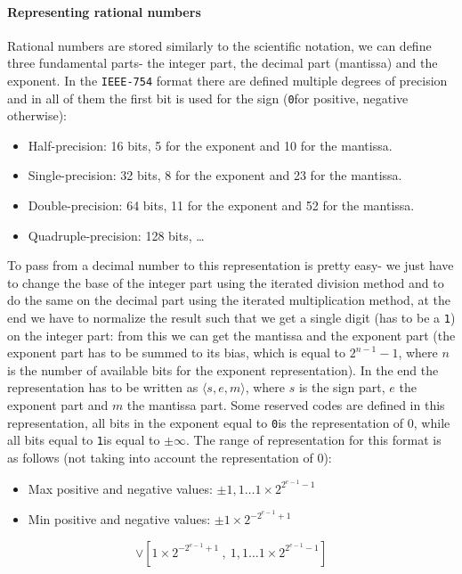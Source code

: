 \documentclass{scrartcl}
\newcommand{\zero}{\texttt{0}}
\newcommand{\one}{\texttt{1}}
\begin{document}
    \paragraph{Representing rational numbers}
    Rational numbers are stored similarly to the scientific notation, we can define three fundamental parts- the integer part, the decimal part (mantissa) and the exponent. In the \texttt{IEEE-754} format there are defined multiple degrees of precision and in all of them the first bit is used for the sign (\zero for positive, negative otherwise):
    \begin{itemize}
        \item Half-precision: 16 bits, 5 for the exponent and 10 for the mantissa.
        \item Single-precision: 32 bits, 8 for the exponent and 23 for the mantissa.
        \item Double-precision: 64 bits, 11 for the exponent and 52 for the mantissa.
        \item Quadruple-precision: 128 bits, \dots
    \end{itemize}
    To pass from a decimal number to this representation is pretty easy- we just have to change the base of the integer part using the iterated division method and to do the same on the decimal part using the iterated multiplication method, at the end we have to normalize the result such that we get a single digit (has to be a \one) on the integer part: from this we can get the mantissa and the exponent part (the exponent part has to be summed to its bias, which is equal to $2^{n-1}-1$, where $n$ is the number of available bits for the exponent representation). In the end the representation has to be written as $\langle s,e,m\rangle$, where $s$ is the sign part, $e$ the exponent part and $m$ the mantissa part.
    Some reserved codes are defined in this representation, all bits in the exponent equal to \zero is the representation of $0$, while all bits equal to \one is equal to $\pm\infty$. The range of representation for this format is as follows (not taking into account the representation of $0$):
    \begin{itemize}
        \item Max positive and negative values: $\pm 1,1\dots 1\times 2^{2^{e-1}-1}$
        \item Min positive and negative values: $\pm 1\times 2^{-2^{e-1}+1}$
    \end{itemize}
    \begin{equation*}
        [-1,1\dots 1\times 2^{2^{e-1}-1}\ ,\ -1\times 2^{-2^{e-1}+1}] \vee [1\times 2^{-2^{e-1}+1}\ ,\ 1,1\dots 1\times 2^{2^{e-1}-1}]
    \end{equation*}
\end{document}

